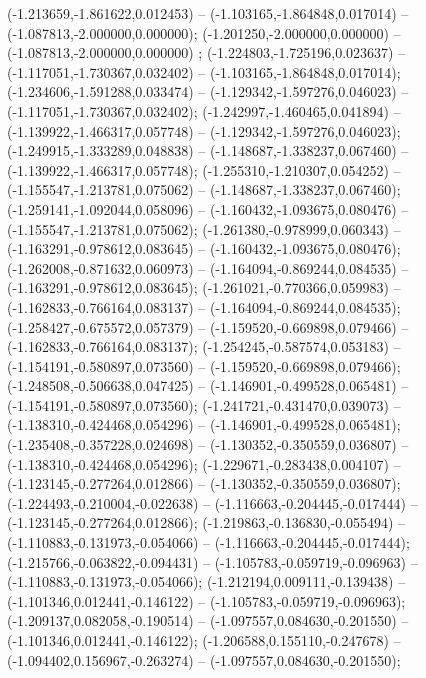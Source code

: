  (-1.213659,-1.861622,0.012453) -- (-1.103165,-1.864848,0.017014) -- (-1.087813,-2.000000,0.000000);
 (-1.201250,-2.000000,0.000000) -- (-1.087813,-2.000000,0.000000) ;
 (-1.224803,-1.725196,0.023637) -- (-1.117051,-1.730367,0.032402) -- (-1.103165,-1.864848,0.017014);
 (-1.234606,-1.591288,0.033474) -- (-1.129342,-1.597276,0.046023) -- (-1.117051,-1.730367,0.032402);
 (-1.242997,-1.460465,0.041894) -- (-1.139922,-1.466317,0.057748) -- (-1.129342,-1.597276,0.046023);
 (-1.249915,-1.333289,0.048838) -- (-1.148687,-1.338237,0.067460) -- (-1.139922,-1.466317,0.057748);
 (-1.255310,-1.210307,0.054252) -- (-1.155547,-1.213781,0.075062) -- (-1.148687,-1.338237,0.067460);
 (-1.259141,-1.092044,0.058096) -- (-1.160432,-1.093675,0.080476) -- (-1.155547,-1.213781,0.075062);
 (-1.261380,-0.978999,0.060343) -- (-1.163291,-0.978612,0.083645) -- (-1.160432,-1.093675,0.080476);
 (-1.262008,-0.871632,0.060973) -- (-1.164094,-0.869244,0.084535) -- (-1.163291,-0.978612,0.083645);
 (-1.261021,-0.770366,0.059983) -- (-1.162833,-0.766164,0.083137) -- (-1.164094,-0.869244,0.084535);
 (-1.258427,-0.675572,0.057379) -- (-1.159520,-0.669898,0.079466) -- (-1.162833,-0.766164,0.083137);
 (-1.254245,-0.587574,0.053183) -- (-1.154191,-0.580897,0.073560) -- (-1.159520,-0.669898,0.079466);
 (-1.248508,-0.506638,0.047425) -- (-1.146901,-0.499528,0.065481) -- (-1.154191,-0.580897,0.073560);
 (-1.241721,-0.431470,0.039073) -- (-1.138310,-0.424468,0.054296) -- (-1.146901,-0.499528,0.065481);
 (-1.235408,-0.357228,0.024698) -- (-1.130352,-0.350559,0.036807) -- (-1.138310,-0.424468,0.054296);
 (-1.229671,-0.283438,0.004107) -- (-1.123145,-0.277264,0.012866) -- (-1.130352,-0.350559,0.036807);
 (-1.224493,-0.210004,-0.022638) -- (-1.116663,-0.204445,-0.017444) -- (-1.123145,-0.277264,0.012866);
 (-1.219863,-0.136830,-0.055494) -- (-1.110883,-0.131973,-0.054066) -- (-1.116663,-0.204445,-0.017444);
 (-1.215766,-0.063822,-0.094431) -- (-1.105783,-0.059719,-0.096963) -- (-1.110883,-0.131973,-0.054066);
 (-1.212194,0.009111,-0.139438) -- (-1.101346,0.012441,-0.146122) -- (-1.105783,-0.059719,-0.096963);
 (-1.209137,0.082058,-0.190514) -- (-1.097557,0.084630,-0.201550) -- (-1.101346,0.012441,-0.146122);
 (-1.206588,0.155110,-0.247678) -- (-1.094402,0.156967,-0.263274) -- (-1.097557,0.084630,-0.201550);
